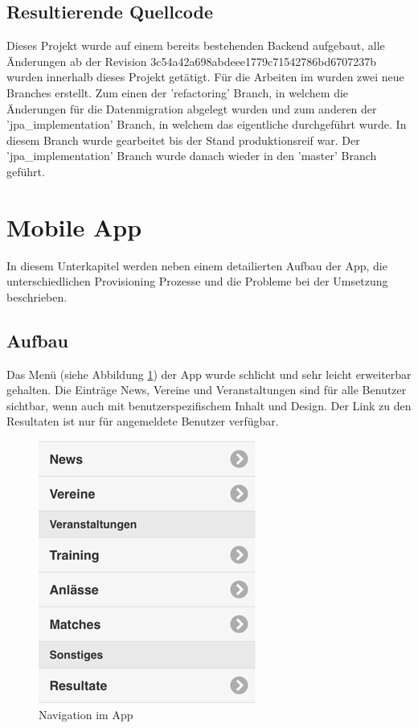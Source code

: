 \subsection{Resultierende Quellcode}
Dieses Projekt wurde auf einem bereits bestehenden Backend aufgebaut, alle Änderungen ab der Revision 3c54a42a698abdeee1779c71542786bd6707237b wurden innerhalb dieses Projekt getätigt. Für die Arbeiten im  wurden zwei neue Branches erstellt. Zum einen der 'refactoring' Branch, in welchem die Änderungen für die Datenmigration abgelegt wurden und zum anderen der 'jpa\_implementation' Branch, in welchem das eigentliche  durchgeführt wurde. In diesem Branch wurde gearbeitet bis der Stand produktionsreif war. Der 'jpa\_implementation' Branch wurde danach wieder in den 'master' Branch geführt.


\section{Mobile App}\label{impl_moblie_app}
In diesem Unterkapitel werden neben einem detailierten Aufbau der App, die unterschiedlichen Provisioning Prozesse und die Probleme bei der Umsetzung beschrieben.

\subsection{Aufbau}
Das Menü (siehe Abbildung \ref{fig:navigation}) der App wurde schlicht und sehr leicht erweiterbar gehalten. Die Einträge News, Vereine und Veranstaltungen sind für alle Benutzer sichtbar, wenn auch mit benutzerspezifischem Inhalt und Design. Der Link zu den Resultaten ist nur für angemeldete Benutzer verfügbar.

\begin{figure}[h]
\centering
\includegraphics{images/app/navigation.png}
\caption{Navigation im App}
\label{fig:navigation}
\end{figure}

